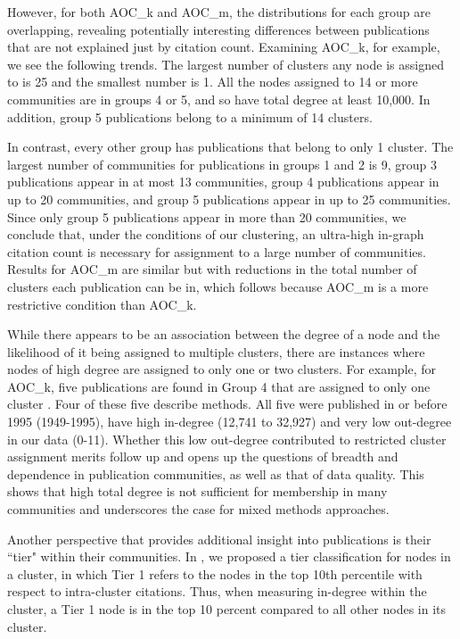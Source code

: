 \documentclass[12pt, oneside]{article}   	%
\begin{document}
However, for both AOC\_k and AOC\_m, the distributions for each group are overlapping, revealing potentially interesting differences between publications that are not explained just by citation count. 
Examining AOC\_k, for example, we see the following trends. The largest number of clusters any node is assigned to is 25 and the smallest number is 1. All the nodes assigned to 14 or more communities are in groups 4 or 5, and so have total degree at least 10,000. In addition, group 5 publications belong to a minimum of 14 clusters. 

In contrast, every other group has publications that belong to only 1 cluster. The largest number of communities for publications in groups 1 and 2 is  9,  group 3 publications appear in at most 13 communities, group 4 publications appear in up to 20 communities, and group 5 publications appear in up to 25 communities.  Since only group 5 publications appear in more than 20 communities, we conclude that, under the conditions of our clustering, an ultra-high in-graph citation count is  necessary  for assignment to a large number of communities.  Results for AOC\_m are similar but with reductions in the total number of clusters each publication can be in,  which follows because AOC\_m is a more restrictive condition than AOC\_k.  

	
While there appears to be an association between the degree of a node and the likelihood of it being assigned to multiple clusters, there are instances where nodes of high degree are assigned to only one or two clusters. 
For example, for AOC\_k, five publications are found in Group 4 that are assigned to only one cluster \citep{arnon1949copper,ellman1961new,friedewald1972estimation,iijima1991helical,raymond1995genepop}. Four of these five describe methods. All five were published in or before 1995 (1949-1995), have high in-degree (12,741 to 32,927) and very low out-degree in our data (0-11). Whether this low out-degree contributed to restricted cluster assignment merits follow up and opens up the questions of breadth and dependence \citep{bu2021multidimensional} in publication communities, as well as that of data quality. This shows that high total degree is not sufficient for membership in many communities and underscores the case for mixed methods approaches.
	
Another perspective that provides additional insight into publications is their ``tier" within their communities. In \cite{Chandrasekharan2021}, we  proposed a tier classification for nodes in a cluster, in which Tier 1 refers to the nodes in the top 10th percentile with respect to intra-cluster citations. Thus, when measuring in-degree within the cluster, a Tier 1 node is in the top 10 percent compared to all other nodes in its cluster. 
\end{document}
